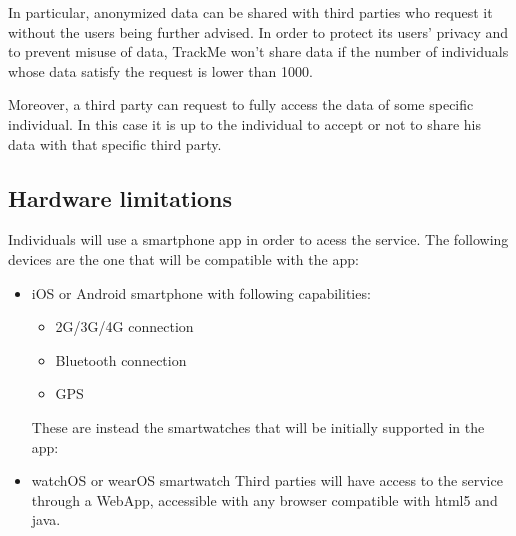 In particular, anonymized data can be shared with third parties who request it without the users being further advised. In order to protect its users' privacy and to prevent misuse of data, TrackMe won't share data if the number of individuals whose data satisfy the request is lower than 1000.

Moreover, a third party can request to fully access the data of some specific individual. In this case it is up to the individual to accept or not to share his data with that specific third party.

\subsection{Hardware limitations}
Individuals will use a smartphone app in order to acess the service.
The following devices are the one that will be compatible with the app:
\begin{itemize}
\item iOS or Android smartphone with following capabilities:
\begin{itemize}
\item 2G/3G/4G connection
\item Bluetooth connection
\item GPS
\end{itemize}
These are instead the smartwatches that will be initially supported in the app:
\item watchOS or wearOS smartwatch
\newline
Third parties will have access to the service through a WebApp, accessible with any browser compatible with html5 and java.
\end{itemize}


